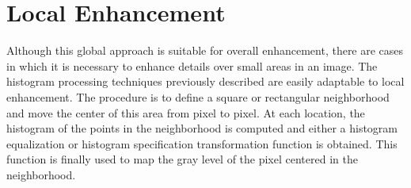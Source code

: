 \documentclass{article}
\begin{document}
\section{Local Enhancement}
Although this global approach is suitable for overall enhancement, there are cases in which it is necessary to enhance details over small areas in an image. The histogram processing techniques previously described are easily adaptable to local enhancement. The procedure is to define a square or rectangular neighborhood and move the center of this area from pixel to pixel. At each location, the histogram of the points in the neighborhood is computed and either a histogram equalization or histogram specification transformation function is obtained. This function is finally used to map the gray level of the pixel centered in the neighborhood.
\end{document}
